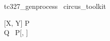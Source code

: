 
\begin{zsection}
  \SECTION\ tc327\_genprocess \parents\ circus\_toolkit
\end{zsection}

\begin{circus}
    \circprocess\ [X, Y] P \circdef\  \circbegin \circspot \Skip \circend \\
    \circprocess\ Q \circdef\ P[\nat, \nat] 
\end{circus}

